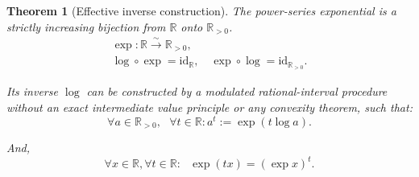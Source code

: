 \documentclass[11pt,reqno]{amsart}
\providecommand{\R}{\mathbb{R}}
\theoremstyle{redplain}
\newtheorem{theorem}{Theorem}[section]
\numberwithin{equation}{section}
\begin{document}
\begin{theorem}[Effective inverse construction]
\label{lem:log-construction} { The power-series exponential
is a strictly increasing bijection from $\mathbb{R}$ onto $\mathbb{R}_{>0}$. 
}%
\begin{equation*}
\begin{gathered}\exp:\mathbb R\overset{\sim}{\longrightarrow}\mathbb
R_{>0},\\
\log\circ\exp=\mathrm{id}_{\R},\quad\exp\circ\log=\mathrm{id}_{\R_{>0}}.%
\end{gathered}
\end{equation*}

{Its inverse $\log $ can be constructed by a modulated rational-interval
procedure without an exact intermediate value principle or any convexity
theorem, such that: } 
\begin{equation*}
\forall a\in 
\mathbb{R}
_{>0},\text{ }\forall t\in 
\mathbb{R}
:a^{t}:=\exp (t\log a).
\end{equation*}

And,%
\begin{equation*}
\forall x\in 
\mathbb{R}
,\forall t\in 
\mathbb{R}
:\text{ }\exp (tx)=(\exp x)^{t}.
\end{equation*}
\end{theorem}
\end{document}
